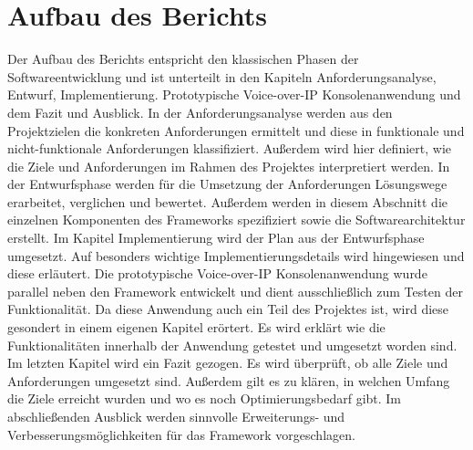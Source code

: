 \section{Aufbau des Berichts}
Der Aufbau des Berichts entspricht den klassischen Phasen der Softwareentwicklung und ist unterteilt in den Kapiteln Anforderungsanalyse, Entwurf, Implementierung.  Prototypische Voice-over-IP Konsolenanwendung und dem Fazit und Ausblick. 
In der Anforderungsanalyse werden aus den Projektzielen die konkreten Anforderungen ermittelt und diese in funktionale und nicht-funktionale Anforderungen klassifiziert. Außerdem wird hier definiert, wie die Ziele und Anforderungen im Rahmen des Projektes interpretiert werden.
In der Entwurfsphase werden für die Umsetzung der Anforderungen Lösungswege erarbeitet, verglichen und bewertet. Außerdem werden in diesem Abschnitt die einzelnen Komponenten des Frameworks spezifiziert sowie die Softwarearchitektur erstellt.
Im Kapitel Implementierung wird der Plan aus der Entwurfsphase umgesetzt. Auf besonders wichtige Implementierungsdetails wird hingewiesen und diese erläutert. 
Die prototypische Voice-over-IP Konsolenanwendung wurde parallel neben den Framework entwickelt und dient ausschließlich zum Testen der Funktionalität. Da diese Anwendung auch ein Teil des Projektes ist, wird diese gesondert in einem eigenen Kapitel erörtert. Es wird erklärt wie die Funktionalitäten innerhalb der Anwendung getestet und umgesetzt worden sind.
Im letzten Kapitel wird ein Fazit gezogen. Es wird überprüft, ob alle Ziele und Anforderungen umgesetzt sind. Außerdem gilt es zu klären, in welchen Umfang die Ziele erreicht wurden und wo es noch Optimierungsbedarf gibt. Im abschließenden Ausblick werden sinnvolle Erweiterungs- und Verbesserungsmöglichkeiten für das Framework vorgeschlagen.
	
